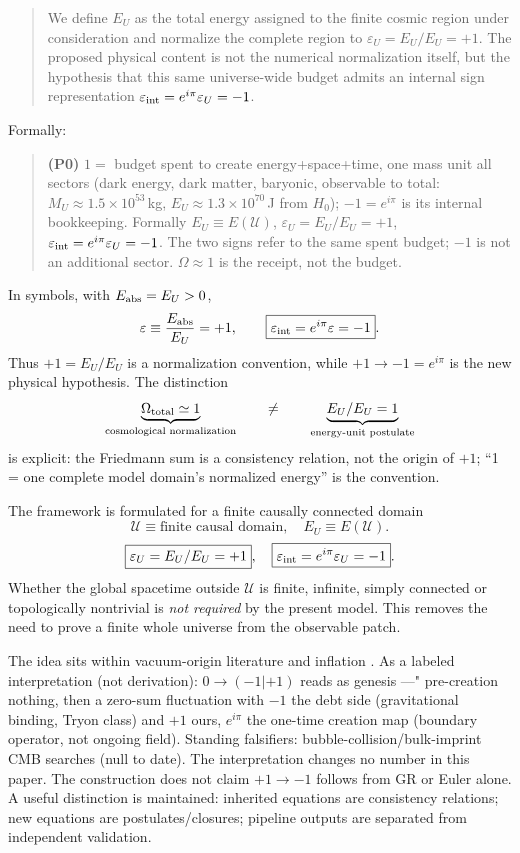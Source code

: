 \documentclass[twocolumn]{aastex631}
\begin{document}
\begin{quote}
We define $E_{U}$ as the total energy assigned to the finite cosmic region under consideration and normalize the complete region to $\varepsilon_{U}=E_{U}/E_{U}=+1$. The proposed physical content is not the numerical normalization itself, but the hypothesis that this same universe-wide budget admits an internal sign representation $\varepsilon_{\rm int}=e^{i\pi}\varepsilon_{U}=-1$.
\end{quote}

Formally:

\begin{quote}
\textbf{(P0)} $1=$ budget spent to create energy+space+time, one mass unit all sectors (dark energy, dark matter, baryonic, observable to total: $M_{U}\approx1.5\times10^{53}$\,kg, $E_{U}\approx1.3\times10^{70}$\,J from $H_{0}$); $-1=e^{i\pi}$ is its internal bookkeeping. Formally $E_{U}\equiv E(\mathcal U)$, $\varepsilon_{U}=E_{U}/E_{U}=+1$, $\varepsilon_{\rm int}=e^{i\pi}\varepsilon_{U}=-1$. The two signs refer to the same spent budget; $-1$ is not an additional sector. $\Omega\approx1$ is the receipt, not the budget.
\end{quote}

In symbols, with $E_{\rm abs}=E_{U}>0$,
\[
\varepsilon\equiv\frac{E_{\rm abs}}{E_{U}}=+1,\qquad \boxed{\varepsilon_{\rm int}=e^{i\pi}\varepsilon=-1}.
\]
Thus $\boxed{+1=E_{U}/E_{U}}$ is a normalization convention, while $\boxed{+1\to-1=e^{i\pi}}$ is the new physical hypothesis. The distinction
\[
\underbrace{\Omega_{\rm total}\simeq1}_{\text{cosmological normalization}}\qquad\neq\qquad\underbrace{E_{U}/E_{U}=1}_{\text{energy-unit postulate}}
\]
is explicit: the Friedmann sum is a consistency relation, not the origin of $+1$; ``1 = one complete model domain's normalized energy'' is the convention.

The framework is formulated for a finite causally connected domain
\[
\boxed{\mathcal U\equiv\text{finite causal domain}},\quad
E_{U}\equiv E(\mathcal U).
\]
\[
\boxed{\varepsilon_{U}=E_{U}/E_{U}=+1},\quad
\boxed{\varepsilon_{\rm int}=e^{i\pi}\varepsilon_{U}=-1}.
\]
Whether the global spacetime outside $\mathcal U$ is finite, infinite, simply connected or topologically nontrivial is \emph{not required} by the present model. This removes the need to prove a finite whole universe from the observable patch.

The idea sits within vacuum-origin literature \cite{Tryon1973,Hawking1988} and inflation \cite{Guth1981}. As a labeled interpretation (not derivation): $0\to(-1|+1)$ reads as genesis ---" pre-creation nothing, then a zero-sum fluctuation with $-1$ the debt side (gravitational binding, Tryon class) and $+1$ ours, $e^{i\pi}$ the one-time creation map (boundary operator, not ongoing field). Standing falsifiers: bubble-collision/bulk-imprint CMB searches (null to date). The interpretation changes no number in this paper. The construction does not claim $+1\to-1$ follows from GR or Euler alone. A useful distinction is maintained: inherited equations are consistency relations; new equations are postulates/closures; pipeline outputs are separated from independent validation.
\end{document}

